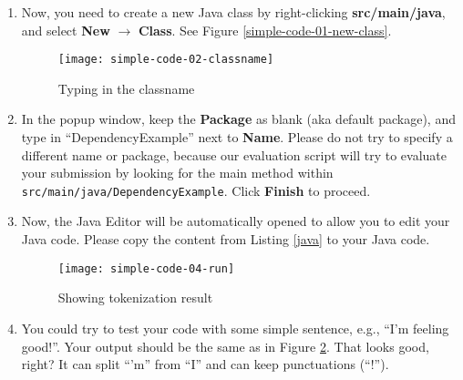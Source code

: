 \begin{enumerate}
\item Now, you need to create a new Java class by right-clicking \textbf{src/main/java}, and select \textbf{New} $\rightarrow$ \textbf{Class}. See Figure \ref{simple-code-01-new-class}.

\begin{figure}
\centering
\texttt{[image: simple-code-02-classname]}
\caption{Typing in the classname\label{simple-code-02-classname}}
\end{figure}

\item In the popup window, keep the \textbf{Package} as blank (aka default package), and type in ``DependencyExample'' next to \textbf{Name}. Please do not try to specify a different name or package, because our evaluation script will try to evaluate your submission by looking for the main method within \texttt{src/main/java/DependencyExample}. Click \textbf{Finish} to proceed.



\item Now, the Java Editor will be automatically opened to allow you to edit your Java code. Please copy the content from Listing \ref{java} to your Java code.

\begin{figure}
\centering
\texttt{[image: simple-code-04-run]}
\caption{Showing tokenization result\label{simple-code-04-run}}
\end{figure}

\item You could try to test your code with some simple sentence, e.g., ``I'm feeling good!''. Your output should be the same as in Figure \ref{simple-code-04-run}. That looks good, right? It can split ``'m'' from ``I'' and can keep punctuations (``!'').


\end{enumerate}
